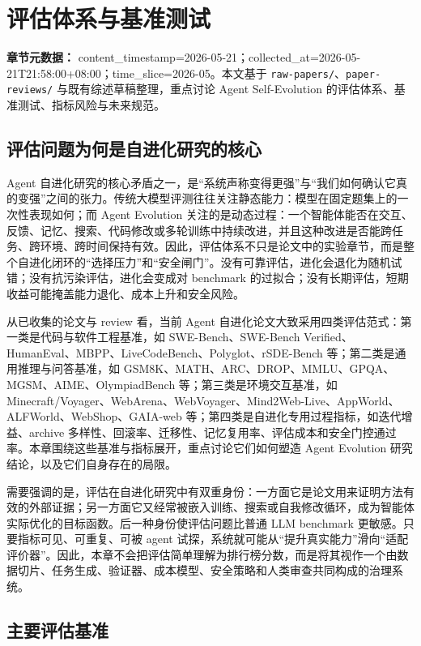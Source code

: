 \section{评估体系与基准测试}
\label{sec:evaluation}

\noindent\textbf{章节元数据：} content\_timestamp=2026-05-21；collected\_at=2026-05-21T21:58:00+08:00；time\_slice=2026-05。本文基于 \texttt{raw-papers/}、\texttt{paper-reviews/} 与既有综述草稿整理，重点讨论 Agent Self-Evolution 的评估体系、基准测试、指标风险与未来规范。

\subsection{评估问题为何是自进化研究的核心}

Agent 自进化研究的核心矛盾之一，是“系统声称变得更强”与“我们如何确认它真的变强”之间的张力。传统大模型评测往往关注静态能力：模型在固定题集上的一次性表现如何；而 Agent Evolution 关注的是动态过程：一个智能体能否在交互、反馈、记忆、搜索、代码修改或多轮训练中持续改进，并且这种改进是否能跨任务、跨环境、跨时间保持有效。因此，评估体系不只是论文中的实验章节，而是整个自进化闭环的“选择压力”和“安全闸门”。没有可靠评估，进化会退化为随机试错；没有抗污染评估，进化会变成对 benchmark 的过拟合；没有长期评估，短期收益可能掩盖能力退化、成本上升和安全风险。

从已收集的论文与 review 看，当前 Agent 自进化论文大致采用四类评估范式：第一类是代码与软件工程基准，如 SWE-Bench、SWE-Bench Verified、HumanEval、MBPP、LiveCodeBench、Polyglot、rSDE-Bench 等；第二类是通用推理与问答基准，如 GSM8K、MATH、ARC、DROP、MMLU、GPQA、MGSM、AIME、OlympiadBench 等；第三类是环境交互基准，如 Minecraft/Voyager、WebArena、WebVoyager、Mind2Web-Live、AppWorld、ALFWorld、WebShop、GAIA-web 等；第四类是自进化专用过程指标，如迭代增益、archive 多样性、回滚率、迁移性、记忆复用率、评估成本和安全门控通过率。本章围绕这些基准与指标展开，重点讨论它们如何塑造 Agent Evolution 研究结论，以及它们自身存在的局限。

需要强调的是，评估在自进化研究中有双重身份：一方面它是论文用来证明方法有效的外部证据；另一方面它又经常被嵌入训练、搜索或自我修改循环，成为智能体实际优化的目标函数。后一种身份使评估问题比普通 LLM benchmark 更敏感。只要指标可见、可重复、可被 agent 试探，系统就可能从“提升真实能力”滑向“适配评价器”。因此，本章不会把评估简单理解为排行榜分数，而是将其视作一个由数据切片、任务生成、验证器、成本模型、安全策略和人类审查共同构成的治理系统。

\subsection{主要评估基准}

